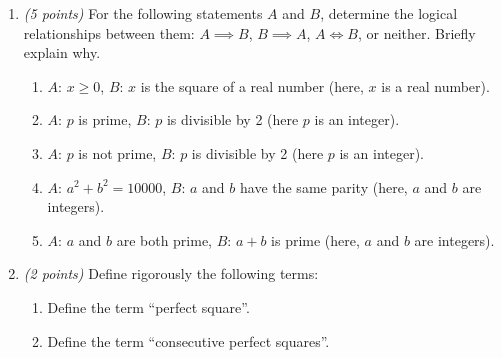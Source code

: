 \documentclass[12pt]{article}
\begin{document}
\begin{enumerate}[label=\textbf{\arabic*.}, itemsep=1.2em]

\item \emph{(5 points)} For the following statements \(A\) and \(B\), determine the logical relationships between them: \(A \implies B\), \(B \implies A\), \(A \iff B\), or neither. Briefly explain why.

\begin{enumerate}[label=\textbf{\alph*.}, itemsep=0.8em]
    \item \(A\): \(x \geq 0\), \(B\): \(x\) is the square of a real number (here, \(x\) is a real number). \newline
    
    \item \(A\): \(p\) is prime, \(B\): \(p\) is divisible by 2 (here \(p\) is an integer). \newline
    
    \item \(A\): \(p\) is not prime, \(B\): \(p\) is divisible by 2 (here \(p\) is an integer). \newline
    
    
    \item \(A\): \(a^2 + b^2 = 10000\), \(B\): \(a\) and \(b\) have the same parity (here, \(a\) and \(b\) are integers). \newline
    
    \item \(A\): \(a\) and \(b\) are both prime, \(B\): \(a + b\) is prime (here, \(a\) and \(b\) are integers). \newline
    
\end{enumerate}



\item \emph{(2 points)} Define rigorously the following terms:
\begin{enumerate}[label=\textbf{\alph*.}, itemsep=0.8em]
    \item Define the term ``perfect square''. \newline
    
    \item Define the term ``consecutive perfect squares''.\newline
\end{enumerate}



\end{enumerate}
\end{document}
